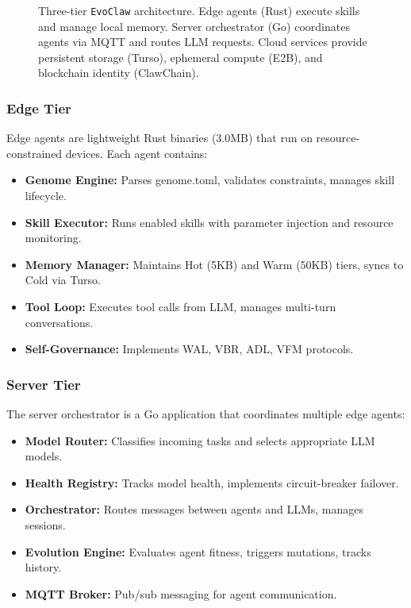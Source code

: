 \documentclass{article}
\newcommand{\evoclaw}{\texttt{EvoClaw}\xspace}
\begin{document}
\begin{figure}[t]
\caption{Three-tier \evoclaw{} architecture. Edge agents (Rust) execute skills and manage local memory. Server orchestrator (Go) coordinates agents via MQTT and routes LLM requests. Cloud services provide persistent storage (Turso), ephemeral compute (E2B), and blockchain identity (ClawChain).}
\label{fig:architecture}
\end{figure}

\subsubsection{Edge Tier}

Edge agents are lightweight Rust binaries (3.0MB) that run on resource-constrained devices. Each agent contains:

\begin{itemize}[leftmargin=*]
    \item \textbf{Genome Engine:} Parses genome.toml, validates constraints, manages skill lifecycle.
    \item \textbf{Skill Executor:} Runs enabled skills with parameter injection and resource monitoring.
    \item \textbf{Memory Manager:} Maintains Hot (5KB) and Warm (50KB) tiers, syncs to Cold via Turso.
    \item \textbf{Tool Loop:} Executes tool calls from LLM, manages multi-turn conversations.
    \item \textbf{Self-Governance:} Implements WAL, VBR, ADL, VFM protocols.
\end{itemize}

\subsubsection{Server Tier}

The server orchestrator is a Go application that coordinates multiple edge agents:

\begin{itemize}[leftmargin=*]
    \item \textbf{Model Router:} Classifies incoming tasks and selects appropriate LLM models.
    \item \textbf{Health Registry:} Tracks model health, implements circuit-breaker failover.
    \item \textbf{Orchestrator:} Routes messages between agents and LLMs, manages sessions.
    \item \textbf{Evolution Engine:} Evaluates agent fitness, triggers mutations, tracks history.
    \item \textbf{MQTT Broker:} Pub/sub messaging for agent communication.
\end{itemize}
\end{document}
